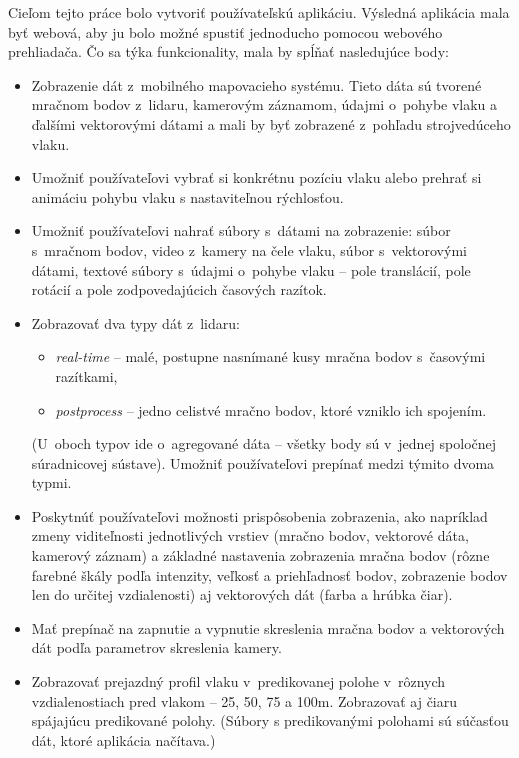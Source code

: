 Cieľom tejto práce bolo vytvoriť používateľskú aplikáciu. Výsledná aplikácia mala byť webová, aby ju bolo možné spustiť jednoducho pomocou webového prehliadača. Čo sa týka funkcionality, mala by spĺňať nasledujúce body:

\begin{itemize}
    \item Zobrazenie dát z~mobilného mapovacieho systému. Tieto dáta sú tvorené mračnom bodov z~lidaru, kamerovým záznamom, údajmi o~pohybe vlaku a ďalšími vektorovými dátami a mali by byť zobrazené z~pohľadu strojvedúceho vlaku.
    \item Umožniť používateľovi vybrať si konkrétnu pozíciu vlaku alebo prehrať si animáciu pohybu vlaku s nastaviteľnou rýchlosťou.
    \item Umožniť používateľovi nahrať súbory s~dátami na zobrazenie: súbor s~mračnom bodov, video z~kamery na čele vlaku, súbor s~vektorovými dátami, textové súbory s~údajmi o~pohybe vlaku -- pole translácií, pole rotácií a pole zodpovedajúcich časových razítok.
    \item Zobrazovať dva typy dát z~lidaru:
    \begin{itemize}
        \item \emph{real-time} -- malé, postupne nasnímané kusy mračna bodov s~časovými razítkami,
        \item \emph{postprocess} -- jedno celistvé mračno bodov, ktoré vzniklo ich spojením.
    \end{itemize}
    (U~oboch typov ide o~agregované dáta -- všetky body sú v~jednej spoločnej súradnicovej sústave). Umožniť používateľovi prepínať medzi týmito dvoma typmi.
    \item Poskytnúť používateľovi možnosti prispôsobenia zobrazenia, ako napríklad zmeny viditeľnosti jednotlivých vrstiev (mračno bodov, vektorové dáta, kamerový záznam) a základné nastavenia zobrazenia mračna bodov (rôzne farebné škály podľa intenzity, veľkosť a priehľadnosť bodov, zobrazenie bodov len do určitej vzdialenosti) aj vektorových dát (farba a hrúbka čiar).
    \item Mať prepínač na zapnutie a vypnutie skreslenia mračna bodov a vektorových dát podľa parametrov skreslenia kamery.
    \item Zobrazovať prejazdný profil vlaku v~predikovanej polohe v~rôznych vzdialenostiach pred vlakom -- 25, 50, 75 a 100m. Zobrazovať aj čiaru spájajúcu predikované polohy. (Súbory s predikovanými polohami sú súčasťou dát, ktoré aplikácia načítava.)

\end{itemize}

